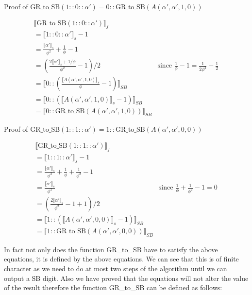 \documentclass{cs4rep}
\begin{document}
Proof of $\mbox{GR\_to\_SB}(1::0::\alpha' ) = 0 :: \mbox{GR\_to\_SB}(A(\alpha',\alpha',1,0))$

\[ \begin{array}{ll}
\llbracket \mbox{GR\_to\_SB}(1::0::\alpha') \rrbracket_{f} \\
= \llbracket 1::0::\alpha' \rrbracket_{s} - 1 \\
= \frac{\llbracket \alpha' \rrbracket_{s}}{\phi^{2}} + \frac{1}{\phi} - 1 \\
= (\frac{2 \llbracket \alpha' \rrbracket_{s} +1/\phi}{\phi^{2}} - 1)/2 & \mbox{since } \frac{1}{\phi} - 1 = \frac{1}{2\phi^{3}} -\frac{1}{2}\\
= \llbracket 0 :: (\frac{\llbracket A(\alpha',\alpha',1,0) \rrbracket_{s}}{\phi} - 1) \rrbracket_{SB} \\
= \llbracket 0 :: ( \llbracket A(\alpha',\alpha',1,0) \rrbracket_{s} -1) \rrbracket_{SB} \\
= \llbracket 0 :: \mbox{GR\_to\_SB}(A(\alpha',\alpha',1,0)) \rrbracket_{SB}
\end{array} \]


Proof of $\mbox{GR\_to\_SB}(1::1::\alpha' ) = 1 ::
\mbox{GR\_to\_SB}(A(\alpha',\alpha',0,0))$

\[ \begin{array}{ll}
\llbracket \mbox{GR\_to\_SB}(1::1::\alpha') \rrbracket_{f} \\
= \llbracket 1::1::\alpha' \rrbracket_{s} - 1 \\
= \frac{\llbracket \alpha' \rrbracket_{s}}{\phi^{2}} + \frac{1}{\phi} + \frac{1}{\phi^{2}} - 1 \\
= \frac{\llbracket \alpha' \rrbracket_{s}}{\phi^{2}} & \mbox{since } \frac{1}{\phi} + \frac{1}{\phi^{2}} - 1 = 0\\
= (\frac{2 \llbracket \alpha' \rrbracket_{s}}{\phi^{2}} - 1 +1)/2 \\
= \llbracket 1 :: (\llbracket A(\alpha',\alpha',0,0) \rrbracket_{s} -1 ) \rrbracket_{SB} \\
= \llbracket 1 :: \mbox{GR\_to\_SB}(A(\alpha',\alpha',0,0)) \rrbracket_{SB}
\end{array} \]

In fact not only does the function GR\_to\_SB have to satisfy the
above equations, it is defined by the above equations. We can see that
this is of finite character as we need to do at most two steps of the
algorithm until we can output a SB digit. Also we have proved that the
equations will not alter the value of the result therefore the
function GR\_to\_SB can be defined as follows:
\end{document}
